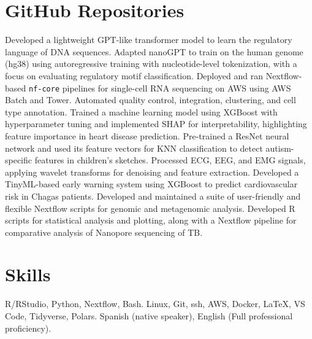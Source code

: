 \documentclass[11pt,a4paper,sans]{moderncv}
\begin{document}
  
\section{GitHub Repositories}
    {Developed a lightweight GPT-like transformer model to learn the regulatory language of DNA sequences. Adapted nanoGPT to train on the human genome (hg38) using autoregressive training with nucleotide-level tokenization, with a focus on evaluating regulatory motif classification.}{}{}
    {}
    {Deployed and ran Nextflow-based \texttt{nf-core} pipelines for single-cell RNA sequencing on AWS using AWS Batch and Tower. Automated quality control, integration, clustering, and cell type annotation.}{}{}
    {}
    {Trained a machine learning model using XGBoost with hyperparameter tuning and implemented SHAP for interpretability, highlighting feature importance in heart disease prediction.}{}{}
    {}  
    {Pre-trained a ResNet neural network and used its feature vectors for KNN classification to detect autism-specific features in children's sketches.}{}{}
    {}
    {Processed ECG, EEG, and EMG signals, applying wavelet transforms for denoising and feature extraction. Developed a TinyML-based early warning system using XGBoost to predict cardiovascular risk in Chagas patients.}{}{}
    {}
    {Developed and maintained a suite of user-friendly and flexible Nextflow scripts for genomic and metagenomic analysis.}{}{}
    {}
    {Developed R scripts for statistical analysis and plotting, along with a Nextflow pipeline for comparative analysis of Nanopore sequencing of TB.}{}{}
    {}

\section{Skills}
  {}{}{R/RStudio, Python, Nextflow, Bash.}
  {}
  {}{Linux, Git, ssh, AWS, Docker, LaTeX, VS Code, Tidyverse, Polars.}{}
  {}
  {}{Spanish (native speaker), English (Full professional proficiency).}
  {}
  {}
\end{document}
